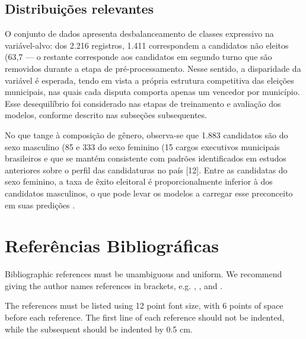 \documentclass[12pt]{article}
\begin{document}
\subsection{Distribuições relevantes}

O conjunto de dados apresenta desbalanceamento de classes expressivo na variável-alvo: dos 2.216
registros, 1.411 correspondem a candidatos não eleitos (63,7%
— o restante corresponde aos candidatos em segundo turno que são removidos durante a etapa de
pré-processamento. Nesse sentido, a disparidade da variável é esperada, tendo em vista a própria
estrutura competitiva das eleições municipais, nas quais cada disputa comporta apenas um vencedor
por município. Esse desequilíbrio foi considerado nas etapas de treinamento e avaliação dos modelos,
conforme descrito nas subseções subsequentes.

No que tange à composição de gênero, observa-se que 1.883 candidatos são do sexo masculino (85%
e 333 do sexo feminino (15%
cargos executivos municipais brasileiros e que se mantém consistente com padrões identificados em
estudos anteriores sobre o perfil das candidaturas no país [12]. Entre as candidatas do sexo feminino,
a taxa de êxito eleitoral é proporcionalmente inferior à dos candidatos masculinos, o que pode levar
os modelos a carregar esse preconceito em suas predições \cite{grari:2020}.

\section{Referências Bibliográficas}

Bibliographic references must be unambiguous and uniform.  We recommend giving
the author names references in brackets, e.g. \cite{knuth:84},
\cite{boulic:91}, and \cite{smith:99}.

The references must be listed using 12 point font size, with 6 points of space
before each reference. The first line of each reference should not be
indented, while the subsequent should be indented by 0.5 cm.



\end{document}
